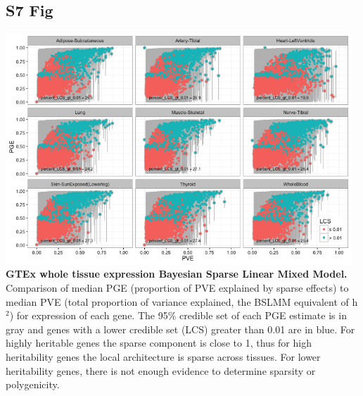 \documentclass[10pt,letterpaper]{article}
\begin{document}
\begin{singlespace}
\subsection*{S7 Fig}
\includegraphics[width=13cm]{Figures/GenArch_Supp/S4Fig.png}
\label{S7_Fig}
{\bf GTEx whole tissue expression Bayesian Sparse Linear Mixed Model.} Comparison of median PGE (proportion of PVE explained by sparse effects) to median PVE (total proportion of variance explained, the BSLMM equivalent of h$^2$) for expression of each gene. The 95\% credible set of each PGE estimate is in gray and genes with a lower credible set (LCS) greater than 0.01 are in blue. For highly heritable genes the sparse component is close to 1, thus for high heritability genes the local architecture is sparse across tissues. For lower heritability genes, there is not enough evidence to determine sparsity or polygenicity. 


\end{singlespace}
\end{document}
